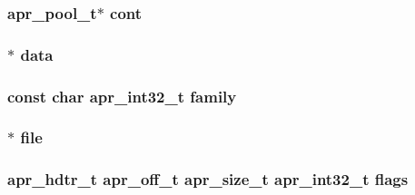 \subsubsection[{\texorpdfstring{cont}{cont}}]{ {\bf apr\+\_\+pool\+\_\+t}$\ast$ cont}\hypertarget{group__apr__network__io_ga888231ce553dfdd4349f77b1e7582636}{}\label{group__apr__network__io_ga888231ce553dfdd4349f77b1e7582636}
\subsubsection[{\texorpdfstring{data}{data}}]{$\ast$ {\bf data}}\hypertarget{group__apr__network__io_ga735984d41155bc1032e09bece8f8d66d}{}\label{group__apr__network__io_ga735984d41155bc1032e09bece8f8d66d}
\subsubsection[{\texorpdfstring{family}{family}}]{\setlength{\rightskip}{0pt plus 5cm}const char {\bf apr\+\_\+int32\+\_\+t} family}\hypertarget{group__apr__network__io_ga22f2baef89908641382fdf6fb41e8b83}{}\label{group__apr__network__io_ga22f2baef89908641382fdf6fb41e8b83}
\subsubsection[{\texorpdfstring{file}{file}}]{$\ast$ file}\hypertarget{group__apr__network__io_ga4a18bbbd412f9ca4387017cbe38eec30}{}\label{group__apr__network__io_ga4a18bbbd412f9ca4387017cbe38eec30}
\subsubsection[{\texorpdfstring{flags}{flags}}]{ {\bf apr\+\_\+hdtr\+\_\+t} {\bf apr\+\_\+off\+\_\+t} {\bf apr\+\_\+size\+\_\+t} {\bf apr\+\_\+int32\+\_\+t} flags}\hypertarget{group__apr__network__io_ga219a94da607c8ebe22e5fdd16352697b}{}\label{group__apr__network__io_ga219a94da607c8ebe22e5fdd16352697b}
